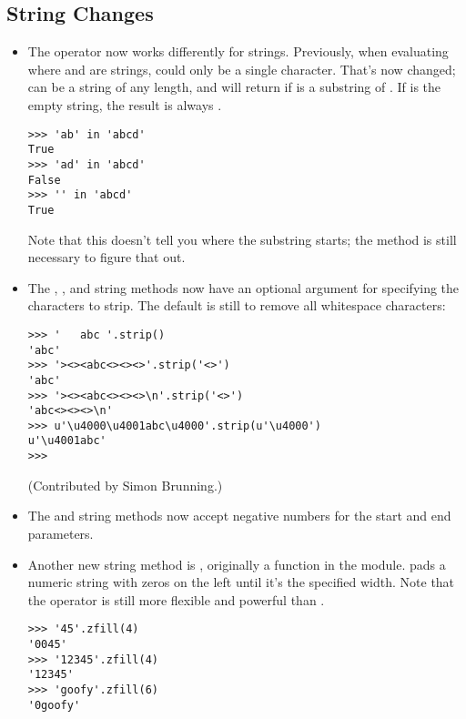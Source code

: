 \documentclass{howto}
\begin{document}
\subsection{String Changes}

\begin{itemize}

\item The  operator now works differently for strings.
Previously, when evaluating  where 
and  are strings,  could only be a single character.
That's now changed;  can be a string of any length, and
 will return  if  is a
substring of .  If  is the empty string, the result is
always .

\begin{verbatim}
>>> 'ab' in 'abcd'
True
>>> 'ad' in 'abcd'
False
>>> '' in 'abcd'
True
\end{verbatim}

Note that this doesn't tell you where the substring starts; the
 method is still necessary to figure that out.

\item The , , and 
string methods now have an optional argument for specifying the
characters to strip.  The default is still to remove all whitespace
characters:

\begin{verbatim}
>>> '   abc '.strip()
'abc'
>>> '><><abc<><><>'.strip('<>')
'abc'
>>> '><><abc<><><>\n'.strip('<>')
'abc<><><>\n'
>>> u'\u4000\u4001abc\u4000'.strip(u'\u4000')
u'\u4001abc'
>>>
\end{verbatim}

(Contributed by Simon Brunning.)

\item The  and 
string methods now accept negative numbers for the start and end
parameters.

\item Another new string method is , originally a
function in the  module.   pads a
numeric string with zeros on the left until it's the specified width.
Note that the \code{\%} operator is still more flexible and powerful
than .

\begin{verbatim}
>>> '45'.zfill(4)
'0045'
>>> '12345'.zfill(4)
'12345'
>>> 'goofy'.zfill(6)
'0goofy'
\end{verbatim}


\end{itemize}
\end{document}

